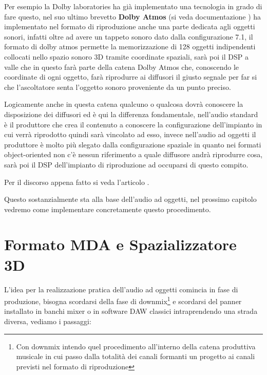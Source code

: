 \documentclass[12pt,a4paper]{report}
\begin{document}
Per esempio la Dolby laboratories ha già implementato una tecnologia in grado di fare questo, nel suo ultimo brevetto \textbf{Dolby Atmos} (si veda documentazione \cite{atmos}) ha implementato nel formato di riproduzione anche una parte dedicata agli oggetti sonori, infatti oltre ad avere un tappeto sonoro dato dalla configurazione 7.1, il formato di dolby atmos permette la memorizzazione di 128 oggetti indipendenti collocati nello spazio sonoro 3D tramite coordinate spaziali, sarà poi il DSP a valle che in questo farà parte della catena Dolby Atmos che, conoscendo le coordinate di ogni oggetto, farà riprodurre ai diffusori il giusto segnale per far si che l'ascoltatore senta l'oggetto sonoro proveniente da un punto preciso.

Logicamente anche in questa catena qualcuno o qualcosa dovrà conoscere la disposizione dei diffusori ed è qui la differenza fondamentale, nell'audio standard è il produttore che crea il contenuto a conoscere la configurazione dell'impianto in cui verrà riprodotto quindi sarà vincolato ad esso, invece nell'audio ad oggetti il produttore è molto più slegato dalla configurazione spaziale in quanto nei formati object-oriented non c'è nessun riferimento a quale diffusore andrà riprodurre cosa, sarà poi il DSP dell'impianto di riproduzione ad occuparsi di questo compito.

Per il discorso appena fatto si veda l'articolo \cite{object}.

Questo sostanzialmente sta alla base dell'audio ad oggetti, nel prossimo capitolo vedremo come implementare concretamente questo procedimento.

\chapter{Formato MDA e Spazializzatore 3D} \label{dolby}

L'idea per la realizzazione pratica dell'audio ad oggetti comincia in fase di produzione, bisogna scordarsi della fase di downmix\footnote{Con downmix intendo quel procedimento all'interno della catena produttiva musicale in cui passo dalla totalità dei canali formanti un progetto ai canali previsti nel formato di riproduzione} e scordarsi del panner installato in banchi mixer o in software DAW classici intraprendendo una strada diversa, vediamo i passaggi:
\end{document}
